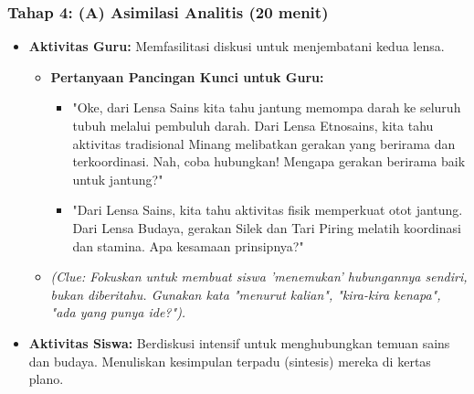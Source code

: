 \documentclass[a4paper,12pt]{article}
\begin{document}
\subsubsection{Tahap 4: (A) Asimilasi Analitis (20 menit)}
\begin{itemize}
\item \textbf{Aktivitas Guru:} Memfasilitasi diskusi untuk menjembatani kedua lensa.
    \begin{itemize}
    \item \textbf{Pertanyaan Pancingan Kunci untuk Guru:}
        \begin{itemize}
        \item "Oke, dari Lensa Sains kita tahu jantung memompa darah ke seluruh tubuh melalui pembuluh darah. Dari Lensa Etnosains, kita tahu aktivitas tradisional Minang melibatkan gerakan yang berirama dan terkoordinasi. Nah, coba hubungkan! Mengapa gerakan berirama baik untuk jantung?"
        \item "Dari Lensa Sains, kita tahu aktivitas fisik memperkuat otot jantung. Dari Lensa Budaya, gerakan Silek dan Tari Piring melatih koordinasi dan stamina. Apa kesamaan prinsipnya?"
        \end{itemize}
    \item \textit{(Clue: Fokuskan untuk membuat siswa 'menemukan' hubungannya sendiri, bukan diberitahu. Gunakan kata "menurut kalian", "kira-kira kenapa", "ada yang punya ide?").}
    \end{itemize}
\item \textbf{Aktivitas Siswa:} Berdiskusi intensif untuk menghubungkan temuan sains dan budaya. Menuliskan kesimpulan terpadu (sintesis) mereka di kertas plano.
\end{itemize}
\end{document}
